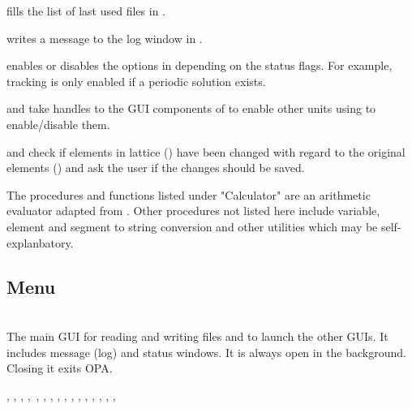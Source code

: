 \documentclass[12pt]{article}
\newcommand\code[1]{{\tt #1}}
\newcommand{\unico}[1]{{\color{burntorange}\code{#1}}}
\newcommand{\opagui}[1]{\colorbox{blue!20}{{\color{black}\code{#1}}}}
\newcommand{\oguih}[2]{\subsection{\label{#2}#1}{\Huge\opagui{#2}}\\}
\newcommand{\ogui}[1]{\hyperref[#1]{\opagui{#1}}}
\newcommand{\opauni}[1]{\colorbox{orange!30}{{\color{black}\code{#1}}}}
\newcommand{\ouni}[1]{\hyperref[#1]{\opauni{#1}}}
\newcommand{\uses}[1]{\flushleft {\bf Uses:} #1}
\newcommand{\desc}[1]{#1}
\begin{document}
{\unico{FillComboSeg} fills the list of last used files in \ogui{opamenu}.

\unico{OPALog} writes a message to the log window in \ogui{opamenu}.

\unico{MainButtonEnable} enables or disables the options in \ogui{opamenu} depending on the status flags. For example, tracking is only enabled if a periodic solution exists.

\unico{PassMainButtonHandles} and \unico{passErrLogHandle} take handles to the GUI components of \ogui{opamenu} to enable other units using \ouni{globlib} to enable/disable them.

\unico{EllaSave} and \unico{Elcompare} check if elements in lattice (\unico{Ella}) have been changed with regard to the original elements (\unico{Elem}) and ask the user if the changes should be saved.

The procedures and functions listed under "Calculator" are an arithmetic evaluator adapted from \cite{rosetta}. Other procedures not listed here include variable, element and segment to string conversion and other utilities which may be self-explanbatory.
}




\oguih{Menu}{opamenu}

\desc{The main GUI for reading and writing files and to launch the other GUIs. It includes message (log) and status windows. It is always open in the background. Closing it exits OPA.}

\uses{\ouni{globlib}, \ogui{opaeditor}, \ogui{opatexteditor}, \ouni{latfilelib},\ \ogui{opalinop}, \ogui{opatunediag}, 
  \ogui{opamomentum}, \ogui{opachroma}, \ogui{opatrackps},  \ogui{opatrackda}, \ogui{opatracktt}, \ogui{opaorbit},
  \ogui{opageometry}, \ogui{opalgbedit}, \ogui{opabucket}, \ogui{opacurrents}, \ouni{testcode}}
 
\end{document}
